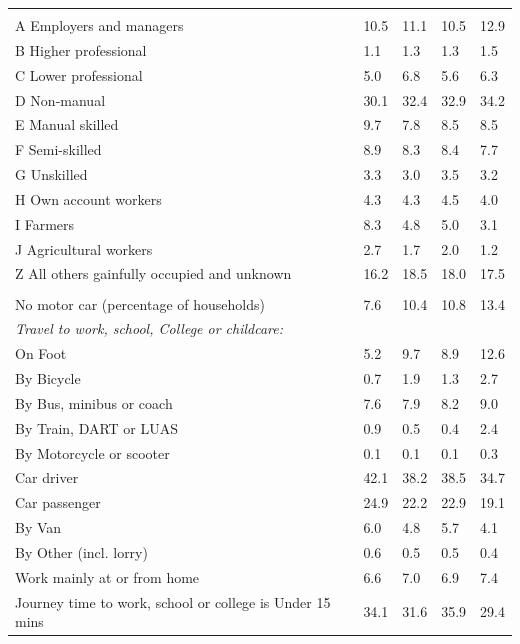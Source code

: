 \documentclass{article}
\begin{document}
\begin{table}[h]
\begin{tabular}{KTTTT}
\hline
    \\ 
    \hline
A Employers and managers & 10.5& 11.1& 10.5& 12.9\\
B Higher professional & 1.1& 1.3& 1.3& 1.5\\
C Lower professional & 5.0& 6.8& 5.6& 6.3\\
D Non-manual & 30.1& 32.4& 32.9& 34.2\\
E Manual skilled & 9.7& 7.8& 8.5& 8.5\\
F Semi-skilled & 8.9& 8.3& 8.4& 7.7\\
G Unskilled & 3.3& 3.0& 3.5& 3.2\\
H Own account workers & 4.3& 4.3& 4.5& 4.0\\
I Farmers & 8.3& 4.8& 5.0& 3.1\\
J Agricultural workers & 2.7& 1.7& 2.0& 1.2\\
Z All others gainfully occupied and unknown & 16.2& 18.5& 18.0& 17.5\\
\hline
{}\hline
    \\ 
    \hline
No motor car (percentage of households) &  7.6& 10.4& 10.8& 
13.4\\
    \hline 
\emph{Travel to work, school, College or childcare:} & & & \\
\quad On Foot &  5.2&  9.7&  8.9& 12.6\\ 
\quad By Bicycle & 0.7& 1.9& 1.3& 2.7\\ 
\quad By Bus, minibus or coach & 7.6& 7.9& 8.2& 9.0\\
\quad By Train, DART or LUAS & 0.9& 0.5& 0.4& 2.4\\
\quad By Motorcycle or scooter & 0.1& 0.1& 0.1& 0.3\\
\quad Car driver & 42.1 & 38.2& 38.5& 34.7\\
\quad Car passenger & 24.9& 22.2& 22.9& 19.1\\
\quad By Van & 6.0& 4.8& 5.7& 4.1\\
\quad By Other (incl. lorry) & 0.6& 0.5& 0.5& 0.4\\
    \hline
Work mainly at or from home & 6.6& 7.0& 6.9& 7.4\\
Journey time to work, school or college is Under 15 mins & 34.1& 31.6& 35.9& 29.4\\

\end{tabular}
\end{table}
\end{document}
